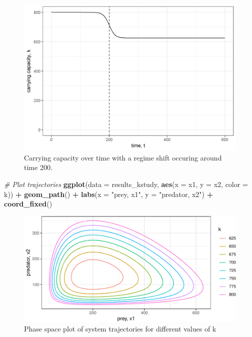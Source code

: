\documentclass[12pt,twoside,openany]{reedthesis}
\newenvironment{Shaded}{\begin{snugshade}}{\end{snugshade}}
\newcommand{\KeywordTok}[1]{\textcolor[rgb]{0.13,0.29,0.53}{\textbf{#1}}}
\newcommand{\DataTypeTok}[1]{\textcolor[rgb]{0.13,0.29,0.53}{#1}}
\newcommand{\StringTok}[1]{\textcolor[rgb]{0.31,0.60,0.02}{#1}}
\newcommand{\CommentTok}[1]{\textcolor[rgb]{0.56,0.35,0.01}{\textit{#1}}}
\newcommand{\OperatorTok}[1]{\textcolor[rgb]{0.81,0.36,0.00}{\textbf{#1}}}
\newcommand{\NormalTok}[1]{#1}
\begin{document}
\begin{figure}
\includegraphics[width=27.08in]{./chapterFiles/fiGuide/figures/kByTime} \caption{Carrying capacity over time with a regime shift occuring around time 200.}\label{fig:kByTime}
\end{figure}
\begin{Shaded}
\begin{Highlighting}[]
\CommentTok{# Plot trajectories}
\KeywordTok{ggplot}\NormalTok{(}\DataTypeTok{data =}\NormalTok{ results_kstudy, }\KeywordTok{aes}\NormalTok{(}\DataTypeTok{x =}\NormalTok{ x1, }\DataTypeTok{y =}\NormalTok{ x2, }\DataTypeTok{color =}\NormalTok{ k)) }\OperatorTok{+}
\StringTok{  }\KeywordTok{geom_path}\NormalTok{() }\OperatorTok{+}
\StringTok{  }\KeywordTok{labs}\NormalTok{(}\DataTypeTok{x =} \StringTok{"prey, x1"}\NormalTok{, }\DataTypeTok{y =} \StringTok{"predator, x2"}\NormalTok{) }\OperatorTok{+}
\StringTok{  }\KeywordTok{coord_fixed}\NormalTok{()}
\end{Highlighting}
\end{Shaded}
\begin{figure}
\centering
\includegraphics{_myDissertation_files/figure-latex/kTrajectories-1.pdf}
\caption{\label{fig:kTrajectories}Phase space plot of system trajectories
for different values of k}
\end{figure}
\end{document}
